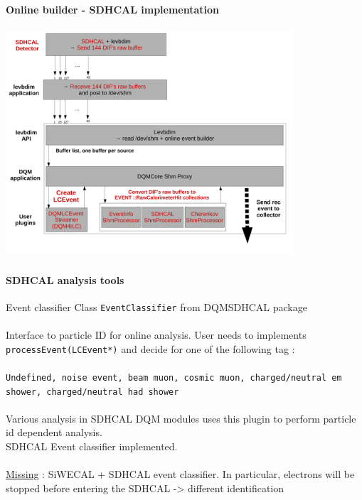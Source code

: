 \documentclass[8pt]{beamer}
\begin{document}
  
  
  \begin{frame}[containsverbatim]
    \frametitle{\secname}
    \framesubtitle{Online builder - SDHCAL implementation}
    \begin{center}
      \includegraphics[width=0.8\textwidth]{figs/DQMeventbuilder_sdhcal.pdf}
    \end{center}
  \end{frame}
  
  
  \begin{frame}[containsverbatim]
    \frametitle{\secname}
    \framesubtitle{SDHCAL analysis tools}
    \begin{block}{Event classifier}
      Class \verb|EventClassifier| from DQMSDHCAL package\\ ~\\
      Interface to particle ID for online analysis. User needs to implements \verb|processEvent(LCEvent*)| and decide for one of the following tag : \\ 
      ~ \\
      {\tt Undefined, noise event, beam muon, cosmic muon, charged/neutral em shower, charged/neutral had shower} \\
      ~ \\
      
      Various analysis in SDHCAL DQM modules uses this plugin to perform particle id dependent analysis. \\
      SDHCAL Event classifier implemented. \\~\\
      \underline{Missing} : SiWECAL + SDHCAL event classifier. In particular, electrons will be stopped before entering the SDHCAL -> different identification
    \end{block}
  \end{frame}
    
\end{document}
